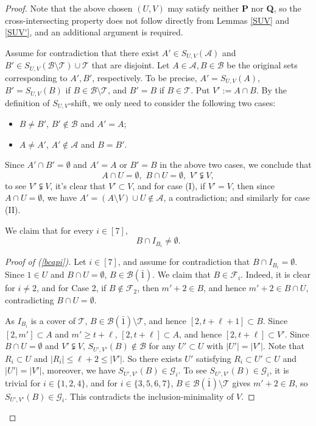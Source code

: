 \documentclass[10pt,a4paper]{amsart}
\def\andrey#1{{\sc Andrey: }{\marrow\sf \textcolor{blue}{#1}}}
\newcommand{\m}{\mathcal}
\def\marrow{{\boldmath {\marginpar[\hfill$\rightarrow \rightarrow$]{$\leftarrow \leftarrow$}}}}
\begin{document}
\begin{proof}
Note that the above chosen $(U,V)$ may satisfy neither {\bf P} nor {\bf Q}, so the cross-intersecting property does not follow directly from Lemmas \ref{SUV} and \ref{SUV'}, and an additional argument is required. 


Assume for contradiction that there exist $A'\in S_{U,V}(\m A)$ and $B'\in S_{U,V}(\m B\setminus \m T)\cup \m T$ that are disjoint.
Let $A\in \m A, B\in \m B$ be the original sets corresponding to $A', B'$, respectively. To be precise, $A'=S_{U,V}(A)$, $B'=S_{U,V}(B)$ if $B\in \m B\setminus \m T$, and  $B'=B$ if $B\in \m T$.
Put $V':=A\cap B$. 
By the definition of $S_{U,V}$-shift,
we only need to consider the following two cases:
\begin{itemize}
    \item[(I)] $B\ne B'$, $B'\not\in \m B$ and $A'=A$; 
    \item[(II)] $A\ne A'$, $A' \not\in \m A$ and $B=B'$.
\end{itemize}
Since $A'\cap B'=\emptyset$ and $A'=A$ or $B'=B$ in the above two cases,
we conclude that 
\[
A\cap U=\emptyset, \,\,B\cap U=\emptyset, \,\, V'\subsetneqq V,
\]
to see $V'\subsetneqq V$, it's clear that $V'\subset V$, and for case (I), if $V'=V$, then since $A\cap U=\emptyset$, we have $A'=(A\setminus V)\cup U\not\in \m A$, a contradiction; and similarly for case (II).

We claim that for every $i\in [7]$, 
\begin{equation}\label{bcapi}
   B\cap I_{B_i}\ne \emptyset.
\end{equation}
\begin{proof}[Proof of (\ref{bcapi})]
Let $i\in [7]$, and assume for contradiction that $B\cap I_{B_i}= \emptyset$. 
Since $1\in U$ and $B\cap U=\emptyset$, $B\in \m B(\bar1)$.
We claim that $B\in \m F_i$. Indeed, it is clear for $i\ne 2$, and for Case 2, if $B\not\in \m F_2$, then $m'+2\in B$, and hence $m'+2\in B\cap U$, contradicting $B\cap U=\emptyset$.

As $I_{B_i}$ is a cover of $\m T$, $B\in \m B(\bar1)\setminus \m T$, and hence $[2,t+\ell +1]\subset B$. 
Since $[2,m']\subset A$ and $m'\ge t+\ell$, 
$[2,t+\ell]\subset A$, and hence $[2,t+\ell]\subset V'$.
Since $B\cap U=\emptyset$ and $V'\subsetneqq V$, $S_{U',V'}(B)\not\in \m B$ for any $U'\subset U$ with $|U'|=|V'|$. Note that $R_i\subset U$ and $|R_i|\le \ell+2\le |V'|$. 
So there exists $U'$ satisfying $R_i\subset U'\subset U$ and $|U'|=|V'|$, moreover, we have $S_{U',V'}(B)\in \m G_i$. To see $S_{U',V'}(B)\in \m G_i$, it is trivial for $i\in \{1,2,4\}$, and for $i\in \{3,5,6,7\}$, $B\in \m B(\bar1)\setminus \m T$ gives $m'+2\in B$, so $S_{U',V'}(B)\in \m G_i$. This contradicts the inclusion-minimality of $V$.   
\end{proof}


\end{proof}
\end{document}
